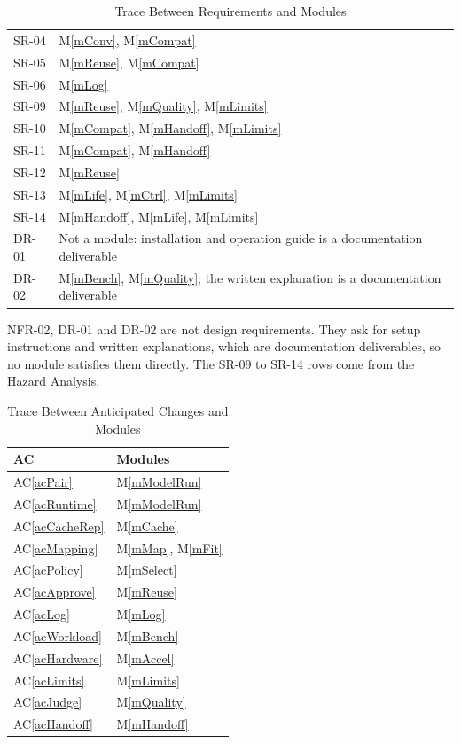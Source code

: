 \documentclass[12pt, titlepage]{article}
\newcommand{\acref}[1]{AC\ref{#1}}
\newcommand{\mref}[1]{M\ref{#1}}
\begin{document}
\begin{table}[H]
\begin{tabular}{p{} p{}}
SR-04 & \mref{mConv}, \mref{mCompat}\\
SR-05 & \mref{mReuse}, \mref{mCompat}\\
SR-06 & \mref{mLog}\\
SR-09 & \mref{mReuse}, \mref{mQuality}, \mref{mLimits}\\
SR-10 & \mref{mCompat}, \mref{mHandoff}, \mref{mLimits}\\
SR-11 & \mref{mCompat}, \mref{mHandoff}\\
SR-12 & \mref{mReuse}\\
SR-13 & \mref{mLife}, \mref{mCtrl}, \mref{mLimits}\\
SR-14 & \mref{mHandoff}, \mref{mLife}, \mref{mLimits}\\
DR-01 & Not a module: installation and operation guide is a documentation deliverable\\
DR-02 & \mref{mBench}, \mref{mQuality}; the written explanation is a documentation deliverable\\
\bottomrule
\end{tabular}
\caption{Trace Between Requirements and Modules}
\label{TblRT}
\end{table}

\noindent NFR-02, DR-01 and DR-02 are not design requirements. They ask for
setup instructions and written explanations, which are documentation
deliverables, so no module satisfies them directly. The SR-09 to SR-14 rows
come from the Hazard Analysis.

\begin{table}[H]
\centering
\begin{tabular}{p{} p{}}
\toprule
\textbf{AC} & \textbf{Modules}\\
\midrule
\acref{acPair} & \mref{mModelRun}\\
\acref{acRuntime} & \mref{mModelRun}\\
\acref{acCacheRep} & \mref{mCache}\\
\acref{acMapping} & \mref{mMap}, \mref{mFit}\\
\acref{acPolicy} & \mref{mSelect}\\
\acref{acApprove} & \mref{mReuse}\\
\acref{acLog} & \mref{mLog}\\
\acref{acWorkload} & \mref{mBench}\\
\acref{acHardware} & \mref{mAccel}\\
\acref{acLimits} & \mref{mLimits}\\
\acref{acJudge} & \mref{mQuality}\\
\acref{acHandoff} & \mref{mHandoff}\\
\bottomrule
\end{tabular}
\caption{Trace Between Anticipated Changes and Modules}
\label{TblACT}
\end{table}
\end{document}
